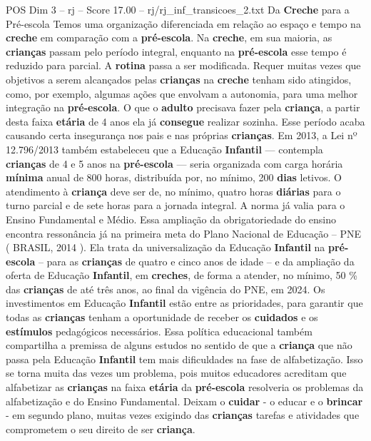 \begin{textsample}{POS Dim 3 – rj – Score 17.00 – rj/rj\_inf\_transicoes\_2.txt}  \label{ex:f3_pos_020}
Da \textbf{Creche} para a Pré-escola Temos uma organização diferenciada em relação ao espaço e tempo na \textbf{creche} em comparação com a \textbf{pré-escola}.
Na \textbf{creche}, em sua maioria, as \textbf{crianças} passam pelo período integral, enquanto na \textbf{pré-escola} esse tempo é reduzido para parcial.
A \textbf{rotina} passa a ser modificada.
Requer muitas vezes que objetivos a serem alcançados pelas \textbf{crianças} na \textbf{creche} tenham sido atingidos, como, por exemplo, algumas ações que envolvam a autonomia, para uma melhor integração na \textbf{pré-escola}.
O que o \textbf{adulto} precisava fazer pela \textbf{criança}, a partir desta faixa \textbf{etária} de 4 anos ela já \textbf{consegue} realizar sozinha.
Esse período acaba causando certa insegurança nos pais e nas próprias \textbf{crianças}.
Em 2013, a Lei nº 12.796/2013 também estabeleceu que a Educação \textbf{Infantil} — contempla \textbf{crianças} de 4 e 5 anos na \textbf{pré-escola} — seria organizada com carga horária \textbf{mínima} anual de 800 horas, distribuída por, no mínimo, 200 \textbf{dias} letivos.
O atendimento à \textbf{criança} deve ser de, no mínimo, quatro horas \textbf{diárias} para o turno parcial e de sete horas para a jornada integral.
A norma já valia para o Ensino Fundamental e Médio.
Essa ampliação da obrigatoriedade do ensino encontra ressonância já na primeira meta do Plano Nacional de Educação – PNE ( BRASIL, 2014 ).
Ela trata da universalização da Educação \textbf{Infantil} na \textbf{pré-escola} – para as \textbf{crianças} de quatro e cinco anos de idade – e da ampliação da oferta de Educação \textbf{Infantil}, em \textbf{creches}, de forma a atender, no mínimo, 50 \% das \textbf{crianças} de até três anos, ao final da vigência do PNE, em 2024.
Os investimentos em Educação \textbf{Infantil} estão entre as prioridades, para garantir que todas as \textbf{crianças} tenham a oportunidade de receber os \textbf{cuidados} e os \textbf{estímulos} pedagógicos necessários.
Essa política educacional também compartilha a premissa de alguns estudos no sentido de que a \textbf{criança} que não passa pela Educação \textbf{Infantil} tem mais dificuldades na fase de alfabetização.
Isso se torna muita das vezes um problema, pois muitos educadores acreditam que alfabetizar as \textbf{crianças} na faixa \textbf{etária} da \textbf{pré-escola} resolveria os problemas da alfabetização e do Ensino Fundamental.
Deixam o \textbf{cuidar} - o educar e o \textbf{brincar} - em segundo plano, muitas vezes exigindo das \textbf{crianças} tarefas e atividades que comprometem o seu direito de ser \textbf{criança}.

\end{textsample}
